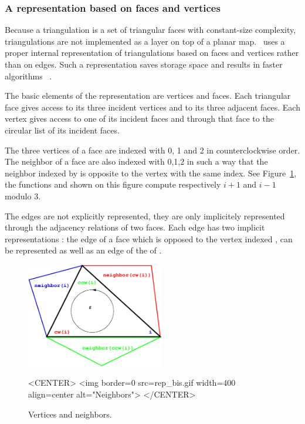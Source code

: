 \subsubsection{ A representation based on faces and vertices}
Because a triangulation is  a set of
triangular faces with constant-size complexity,
triangulations are not implemented
as a layer on top of a planar map.
\cgal\ uses a proper internal
representation of triangulations based on faces and vertices
rather than on edges. Such a  representation
saves storage space and results in faster
algorithms~ \cite{bdty-tcgal-00}.

The basic elements of the representation are vertices and faces.
Each triangular face gives access to its three incident vertices 
and to its three adjacent faces. 
Each vertex gives access to one of its incident faces
and through that face to the circular list of its incident faces.

The three vertices of a face are indexed with 0, 1 and 2
in counterclockwise order. The neighbor of a face are also 
indexed with 0,1,2 in such a way that the neighbor indexed by 
is opposite to the vertex with the same index.
See Figure~\ref{2D_Triangulation_Fig_neighbors1}, 
 the functions 
and  shown  on this figure
compute respectively $i+1$ and $i-1$ modulo 3.

The edges are not explicitly represented, they are only implicitely
represented through the adjacency relations of two faces.
Each edge has two implicit representations : the edge
of a face   which is opposed to the vertex indexed ,
can be represented as well as an edge of the  of 
. 


 \begin{figure}
\begin{ccTexOnly}
    \begin{center}
     \includegraphics[width=6cm]{rep_bis.eps} 
    \end{center}
\end{ccTexOnly} 
    \caption{Vertices and neighbors. 
    \label{2D_Triangulation_Fig_neighbors1} }
  \begin{ccHtmlOnly}
<CENTER>
<img border=0  src=rep_bis.gif width=400 align=center alt="Neighbors">
</CENTER>
\end{ccHtmlOnly} 
\end{figure}


